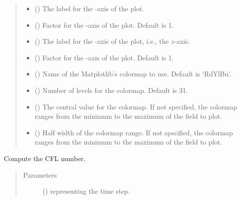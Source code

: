 \documentclass[letterpaper,10pt,english]{sphinxmanual}
\begin{document}
\begin{fulllineitems}
\begin{fulllineitems}
\begin{quote}
\begin{description}
\begin{itemize}
\item {} 
 () \textendash{} The label for the -axis of the plot.

\item {} 
 () \textendash{} Factor for the -axis of the plot. Default is 1.

\item {} 
 () \textendash{} The label for the -axis of the plot, i.e., the \(z\)-axis.

\item {} 
 () \textendash{} Factor for the -axis of the plot. Default is 1.

\item {} 
 () \textendash{} Name of the Matplotlib’s colormap to use. Default is ‘RdYlBu’.

\item {} 
 () \textendash{} Number of levels for the colormap. Default is 31.

\item {} 
 () \textendash{} The central value for the colormap. If not specified, the colormap ranges from the minimum to the maximum
of the field to plot.

\item {} 
 () \textendash{} Half width of the colormap range. If not specified, the colormap ranges from the minimum to the maximum
of the field to plot.

\end{itemize}

\end{description}\end{quote}

\end{fulllineitems}


\begin{fulllineitems}
\label{\detokenize{api:storages.state_isentropic.StateIsentropic.get_cfl}}
Compute the CFL number.
\begin{quote}\begin{description}
\item[{Parameters}] \leavevmode
{} () \textendash{}  representing the time step.


\end{description}
\end{quote}
\end{fulllineitems}
\end{fulllineitems}
\end{document}
